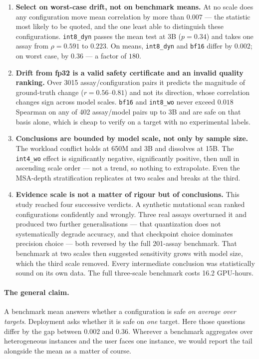 \documentclass[11pt]{article}
\newcommand{\cfg}[1]{\texttt{#1}}
\begin{document}
\begin{enumerate}\setlength{\itemsep}{3pt}
  \item \textbf{Select on worst-case drift, not on benchmark means.} At no scale
        does any configuration move mean correlation by more than $0.007$ --- the
        statistic most likely to be quoted, and the one least able to
        distinguish these configurations. \cfg{int8\_dyn} passes the mean test at
        3B ($p = 0.34$) and takes one assay from $\rho = 0.591$ to $0.223$. On
        means, \cfg{int8\_dyn} and \cfg{bf16} differ by $0.002$; on worst case,
        by $0.36$ --- a factor of $180$.
  \item \textbf{Drift from fp32 is a valid safety certificate and an invalid
        quality ranking.} Over 3015 assay/configuration pairs it predicts the
        magnitude of ground-truth change ($r = 0.56$--$0.81$) and not its
        direction, whose correlation changes sign across model scales.
        \cfg{bf16} and \cfg{int8\_wo} never exceed $0.018$ Spearman on any of
        402 assay/model pairs up to 3B and are safe on that basis alone, which
        is cheap to verify on a target with no experimental labels.
  \item \textbf{Conclusions are bounded by model scale, not only by sample
        size.} The workload conflict holds at 650M and 3B and dissolves at 15B.
        The \cfg{int4\_wo} effect is significantly negative, significantly
        positive, then null in ascending scale order --- not a trend, so nothing
        to extrapolate. Even the MSA-depth stratification replicates at two
        scales and breaks at the third.
  \item \textbf{Evidence scale is not a matter of rigour but of conclusions.}
        This study reached four successive verdicts. A synthetic mutational scan
        ranked configurations confidently and wrongly. Three real assays
        overturned it and produced two further generalisations --- that
        quantization does not systematically degrade accuracy, and that
        checkpoint choice dominates precision choice --- both reversed by the
        full 201-assay benchmark. That benchmark at two scales then suggested
        sensitivity grows with model size, which the third scale removed. Every
        intermediate conclusion was statistically sound on its own data. The
        full three-scale benchmark costs 16.2 GPU-hours.
\end{enumerate}

\paragraph{The general claim.} A benchmark mean answers whether a configuration
is safe \emph{on average over targets}. Deployment asks whether it is safe on
\emph{one} target. Here those questions differ by the gap between $0.002$ and
$0.36$. Wherever a benchmark aggregates over heterogeneous instances and the
user faces one instance, we would report the tail alongside the mean as a matter
of course.
\end{document}
